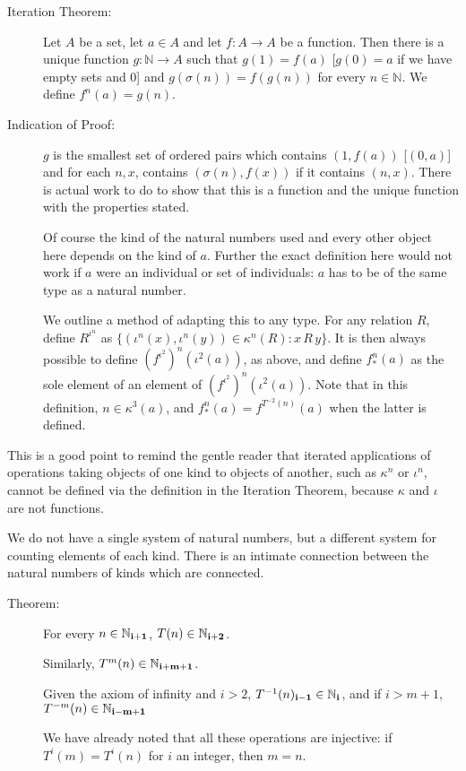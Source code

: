 \documentclass[12pt]{article}
\begin{document}
\begin{description}

\item[Iteration Theorem:]  Let $A$ be a set, let $a \in A$ and let $f:A \rightarrow A$ be a function.
Then there is a unique function $g:\mathbb N \rightarrow A$ such that $g(1) = f(a)$ [$g(0) = a$ if we have empty sets and 0]  and $g(\sigma(n)) = f(g(n))$ for every  $n \in \mathbb N$.  We define $f^n(a) = g(n)$.

\item[Indication of Proof:]  $g$ is the smallest set of ordered pairs which contains $(1,f(a))$ [$(0,a)$] and for each $n,x$, contains $(\sigma(n),f(x))$ if it contains $(n,x)$.  There is actual work to do to show that this is a function and the unique function with the properties stated.

Of course the kind of the natural numbers used  and every other object here depends on the kind of $a$.  Further the exact definition here would not work if $a$ were an individual or set of individuals:  $a$ has to be of the same type as a natural number.  

We outline a method of adapting this to any type.  For any relation $R$, define $R^{\iota^n}$ as $\{(\iota^n(x),\iota^n(y))\in \kappa^n(R):x \, R \, y\}$.   It is then always possible to define $(f^{\iota^2})^n(\iota^2(a))$, as above,
and define  $f^n_*(a)$ as the sole element of an element of $(f^{\iota^2})^n(\iota^2(a))$.  Note that in this definition, $n \in \kappa^3(a)$, and $f^n_*(a) = f^{T^{-2}(n)}(a)$ when the latter is defined.

\end{description}

This is a good point to remind the gentle reader that iterated applications of operations taking objects of one kind to objects of another, such as $\kappa^n$ or $\iota^n$, cannot be defined via the definition in the Iteration Theorem, because $\kappa$ and $\iota$ are not functions.

We do not have a single system of natural numbers, but a different system for counting elements of each kind.
There is an intimate connection between the natural numbers of kinds which are connected.

\begin{description}

\item[Theorem:]  For every $n \in {\mathbb N}_{\bf i+1}$, $T(n) \in {\mathbb N}_{\bf i+2}$.

Similarly, $T^m(n) \in {\mathbb N}_{\bf i+m+1}$.

Given the axiom of infinity and $i>2$, $T^{-1}(n)_{\bf i-1} \in {\mathbb N}_{\bf i}$, and if $i>m+1$,
$T^{-m}(n) \in {\mathbb N}_{\bf i-m+1}$

We have already noted that all these operations are injective:  if $T^i(m)=T^i(n)$ for $i$ an integer, then $m=n$.

\end{description}
\end{document}
